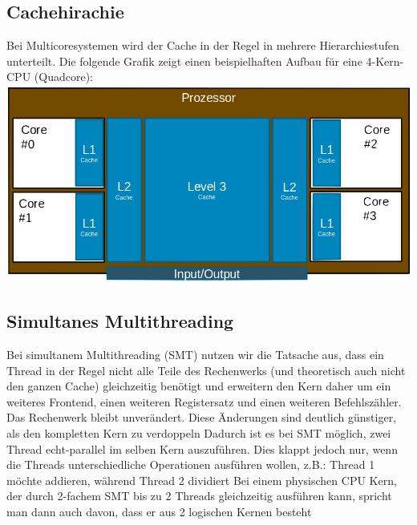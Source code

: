 	\subsection{Cachehirachie}
		Bei Multicoresystemen wird der Cache in der Regel in mehrere Hierarchiestufen unterteilt. Die folgende Grafik zeigt einen beispielhaften Aufbau für eine 4-Kern-CPU (Quadcore): \newline
		\includegraphics[scale=0.42]{quadcore.png}
	\subsection{Simultanes Multithreading}
		Bei simultanem Multithreading (SMT) nutzen wir die Tatsache aus, dass ein Thread in der Regel nicht alle Teile des Rechenwerks (und theoretisch auch nicht den ganzen Cache) gleichzeitig benötigt und erweitern den Kern daher um ein weiteres Frontend, einen weiteren Registersatz und einen weiteren Befehlszähler. Das Rechenwerk bleibt unverändert. Diese Änderungen sind deutlich günstiger, als den kompletten Kern zu verdoppeln \newline \newline
		Dadurch ist es bei SMT möglich, zwei Thread echt-parallel im selben Kern auszuführen. Dies klappt jedoch nur, wenn die Threads unterschiedliche Operationen ausführen wollen, z.B.: Thread 1 möchte addieren, während Thread 2 dividiert \newline \newline
		Bei einem physischen CPU Kern, der durch 2-fachem SMT bis zu 2 Threads gleichzeitig ausführen kann, spricht man dann auch davon, dass er aus 2 logischen Kernen besteht
		
